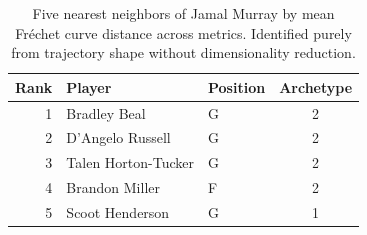 \begin{table}[htbp]
  \centering\small
  \begin{tabular}{rllc}
    \toprule
    Rank & Player & Position & Archetype \\
    \midrule
    1 & Bradley Beal & G & 2 \\
    2 & D'Angelo Russell & G & 2 \\
    3 & Talen Horton-Tucker & G & 2 \\
    4 & Brandon Miller & F & 2 \\
    5 & Scoot Henderson & G & 1 \\
    \bottomrule
  \end{tabular}
  \caption{Five nearest neighbors of Jamal Murray by mean Fr\'{e}chet curve distance across metrics. Identified purely from trajectory shape without dimensionality reduction.}
  \label{tab:Jamal_Murray_frechet_curve_neighbors}
\end{table}

